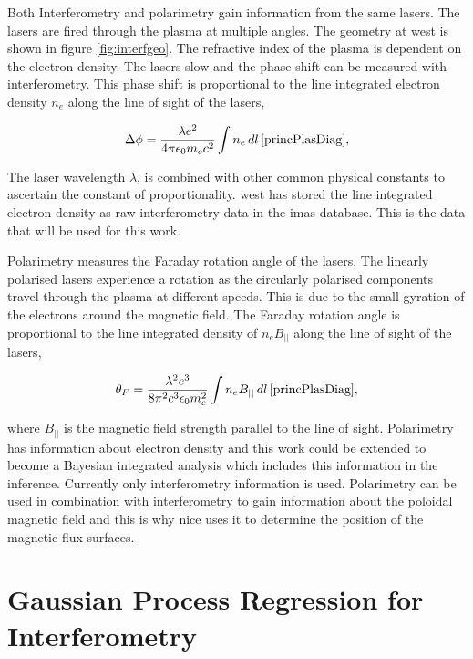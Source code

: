 Both Interferometry and polarimetry gain information from the same lasers. The lasers are fired through the plasma at multiple angles. The geometry at \gls{west} is shown in figure \ref{fig:interfgeo}. The refractive index of the plasma is dependent on the electron density. The lasers slow and the phase shift can be measured with interferometry. This phase shift is proportional to the line integrated electron density $n_e$ along the line of sight of the lasers,

\begin{equation} 
  \label{eq:int_phase}
  \Delta\phi = \frac{\lambda e^{2}}{4 \pi \epsilon_0 m_e c^2 } \int n_e \, dl \, \cite{princPlasDiag},
\end{equation}

\noindent The laser wavelength $\lambda$, is combined with other common physical constants to ascertain the constant of proportionality. \gls{west} has stored the line integrated electron density as raw interferometry data in the \gls{imas} database. This is the data that will be used for this work.

Polarimetry measures the Faraday rotation angle of the lasers. The linearly polarised lasers experience a rotation as the circularly polarised components travel through the plasma at different speeds. This is due to the small gyration of the electrons around the magnetic field. The Faraday rotation angle is proportional to the line integrated density of $n_e B_{||}$ along the line of sight of the lasers, 

\begin{equation}
  \label{eq:pol_farad}
  \theta_F = \frac{\lambda^2 e^3}{8 \pi^2 c^3 \epsilon_0 m_e^2} \int n_e B_{||} \, dl \, \cite{princPlasDiag},
\end{equation}

\noindent where $B_{||}$ is the magnetic field strength parallel to the line of sight. Polarimetry has information about electron density and this work could be extended to become a Bayesian integrated analysis which includes this information in the inference. Currently only interferometry information is used. Polarimetry can be used in combination with interferometry to gain information about the poloidal magnetic field and this is why \gls{nice} uses it to determine the position of the magnetic flux surfaces.

\section{Gaussian Process Regression for Interferometry}\label{sec:GPRforInterf}

